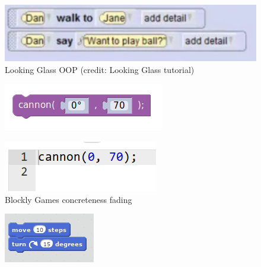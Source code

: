 \documentclass{beamer}
\begin{document}
\begin{frame}
\begin{columns}[onlytextwidth]
\begin{column}{.3\textwidth}
{{{        }{
          \begin{figure}
            \includegraphics[width=1.2\textwidth]{lookingglass}
            \caption{Looking Glass OOP (credit: Looking Glass tutorial)}
          \end{figure}
        }
      }{
        \begin{figure}
          \includegraphics[width=\textwidth]{blocklygames_unfaded}
        \end{figure}
        \begin{figure}
          \includegraphics[width=\textwidth]{blocklygames_faded}
          \caption{Blockly Games concreteness fading}
        \end{figure}
      }
    }{
      \begin{figure}
        \includegraphics[width=\textwidth]{scratch}

\end{figure}}
\end{column}
\end{columns}
\end{frame}
\end{document}

